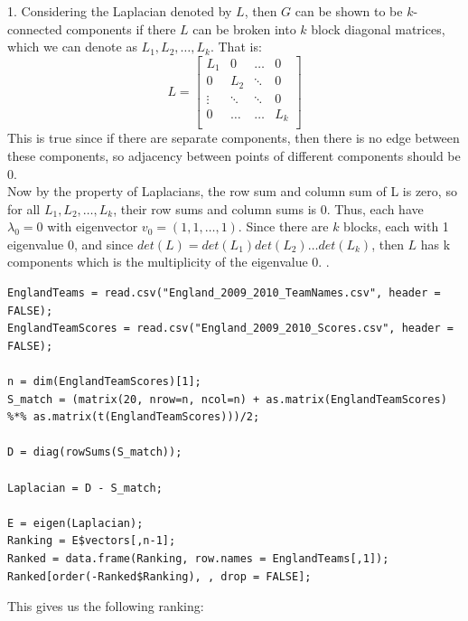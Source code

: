 \documentclass[12pt]{article}
\begin{document}
1. Considering the Laplacian denoted by $L$, then $G$ can be shown to be $k$-connected components if there $L$ can be broken into $k$ block diagonal matrices, which we can denote as $L_1, L_2,\dots,L_k$. That is:
\[ L = 
\begin{bmatrix}
L_1 & 0 & \dots & 0 \\
0 & L_2 & \ddots & 0 \\
\vdots & \ddots & \ddots & 0 \\
0 & \dots & \dots & L_k \\
\end{bmatrix}
\]
This is true since if there are separate components, then there is no edge between these components, so adjacency between points of different components should be 0. \\
Now by the property of Laplacians, the row sum and column sum of L is zero, so for all $L_1, L_2, \dots, L_k$, their row sums and column sums is 0. Thus, each have $\lambda_0 = 0$ with eigenvector $v_0 = (1,1,\dots, 1)$. Since there are $k$ blocks, each with 1 eigenvalue 0, and since $det(L) = det(L_1)det(L_2)\dots det(L_k)$, then $L$ has k components which is the multiplicity of the eigenvalue 0. 
.
\begin{lstlisting}
EnglandTeams = read.csv("England_2009_2010_TeamNames.csv", header = FALSE);
EnglandTeamScores = read.csv("England_2009_2010_Scores.csv", header = FALSE);

n = dim(EnglandTeamScores)[1];
S_match = (matrix(20, nrow=n, ncol=n) + as.matrix(EnglandTeamScores) %*% as.matrix(t(EnglandTeamScores)))/2;

D = diag(rowSums(S_match));

Laplacian = D - S_match;

E = eigen(Laplacian);
Ranking = E$vectors[,n-1];
Ranked = data.frame(Ranking, row.names = EnglandTeams[,1]);
Ranked[order(-Ranked$Ranking), , drop = FALSE];
\end{lstlisting}
This gives us the following ranking:\\ \\
\end{document}
